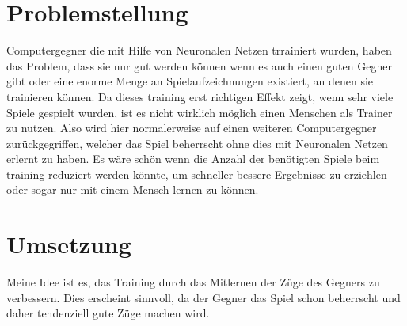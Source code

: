 \section{Problemstellung}

Computergegner die mit Hilfe von Neuronalen Netzen trrainiert wurden, haben das Problem, dass sie nur gut werden können wenn es auch einen guten Gegner gibt oder eine enorme Menge an Spielaufzeichnungen existiert, an denen sie trainieren können. Da dieses training erst richtigen Effekt zeigt, wenn sehr viele Spiele gespielt wurden, ist es nicht wirklich möglich einen Menschen als Trainer zu nutzen. Also wird hier normalerweise auf einen weiteren Computergegner zurückgegriffen, welcher das Spiel beherrscht ohne dies mit Neuronalen Netzen erlernt zu haben. Es wäre schön wenn die Anzahl der benötigten Spiele beim training reduziert werden könnte, um schneller bessere Ergebnisse zu erziehlen oder sogar nur mit einem Mensch lernen zu können.




\section{Umsetzung}

Meine Idee ist es, das Training durch das Mitlernen der Züge des Gegners zu verbessern. Dies erscheint sinnvoll, da der Gegner das Spiel schon beherrscht und daher tendenziell gute Züge machen wird. 














